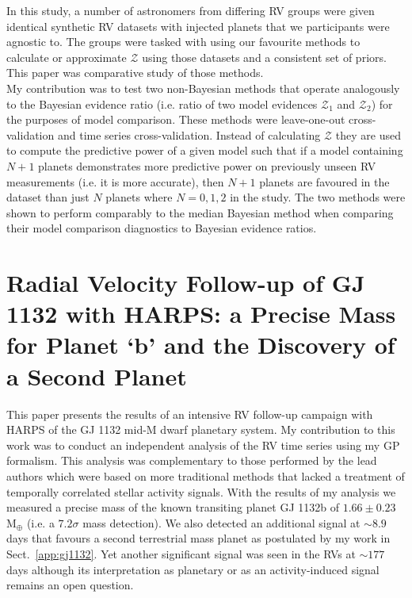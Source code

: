 In this study, a number of astronomers from differing RV groups were given
identical synthetic RV datasets with injected planets that we participants were
agnostic to. The groups were 
tasked with using our favourite methods to calculate or approximate
$\mathcal{Z}$ using those datasets and a consistent set of priors. This paper
was comparative study of those methods. \\

My contribution was to test two non-Bayesian methods that operate
analogously to the Bayesian evidence ratio (i.e. ratio of two model evidences
$\mathcal{Z}_1$ and $\mathcal{Z}_2$) for the purposes of model comparison. These
methods were leave-one-out cross-validation and time series cross-validation.
Instead of calculating $\mathcal{Z}$ they are used to compute the
predictive power of a given model such that if a model containing $N+1$ planets
demonstrates more predictive power on previously unseen RV measurements
(i.e. it is more accurate), then $N+1$ planets are favoured in the dataset
than just $N$ planets where $N=0,1,2$ in the study.
The two methods were shown to perform comparably to
the median Bayesian method when comparing their model comparison diagnostics
to Bayesian evidence ratios.

\section{Radial Velocity Follow-up of GJ 1132 with HARPS: a Precise Mass for
  Planet `b' and the Discovery of a Second Planet \citep{bonfils18}}
\label{sect:gj1132bonfils}
This paper presents the results of an intensive RV follow-up campaign with HARPS
of the GJ 1132 mid-M dwarf
planetary system. My contribution to this work was to conduct an
independent analysis of the RV time series using my GP formalism. This analysis
was complementary to those performed by the lead authors which were based on more
traditional methods that lacked a treatment of temporally correlated stellar
activity signals. With the results of my analysis we measured a precise mass of
the known transiting planet GJ 1132b of $1.66\pm 0.23$ M$_{\oplus}$ (i.e. a
$7.2\sigma$ mass detection). We also detected an additional signal at $\sim 8.9$
days that favours a second terrestrial mass planet as postulated by my work in
Sect.~\ref{app:gj1132}. Yet another significant signal was seen in the RVs at
$\sim 177$ days although its interpretation as planetary or as an
activity-induced signal remains an open question.


